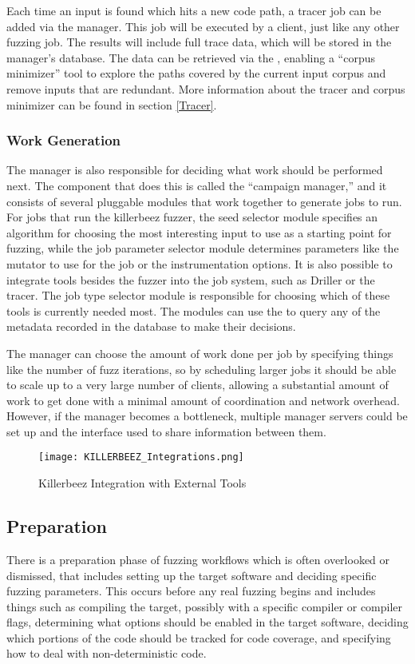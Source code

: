 Each time an input
is found which hits a new code path, a tracer job can be added via the manager.
This job will be executed by a \BOINC{} client, just like any other fuzzing job.
The results will include full trace data, which will be stored in the manager's
database.  The data can be retrieved via the \REST{} \API{}, enabling a ``corpus
minimizer'' tool to explore the paths covered by the current input corpus and
remove inputs that are redundant. More
information about the tracer and corpus minimizer can be found in section
\ref{Tracer}.

\subsubsection{Work Generation}
The manager is also responsible for deciding what work should be performed next.
The component that does this is called the ``campaign manager,'' and it consists
of several pluggable modules that work together to generate jobs to run. For
jobs that run the killerbeez fuzzer, the seed selector module specifies an
algorithm for choosing the most interesting input to use as a starting point for
fuzzing, while the job parameter selector module determines parameters like the
mutator to use for the job or the instrumentation options. It is also possible
to integrate tools besides the fuzzer into the job system, such as Driller or
the tracer. The job type selector module is responsible for choosing which of
these tools is currently needed most. The modules can use the \REST{} \API{} to
query any of the metadata recorded in the database to make their decisions.

The manager can choose the amount of work done per job by specifying things like the
number of fuzz iterations, so by scheduling larger jobs it should be able to scale up to a very large number
of clients, allowing a substantial amount of
work to get done with a minimal amount of coordination and network overhead.
However, if the manager becomes a bottleneck, multiple
manager servers could be set up and the \REST{} interface used to share
information between them.

\begin{figure*}[htb]
\centering
\texttt{[image: KILLERBEEZ\_Integrations.png]}
\caption{Killerbeez Integration with External Tools}
\label{fig:Killerbeez-integrations}
\end{figure*}


\subsection{Preparation}  \label{Preparation Overview}
There is a preparation phase of fuzzing workflows which is often overlooked or
dismissed, that includes setting up the target software and deciding specific
fuzzing parameters. This occurs before any real fuzzing begins and includes
things such as compiling the target, possibly with a specific compiler or
compiler flags, determining what options should be enabled in the target
software, deciding which portions of the code should be tracked for code
coverage, and specifying how to deal with non-deterministic code.

